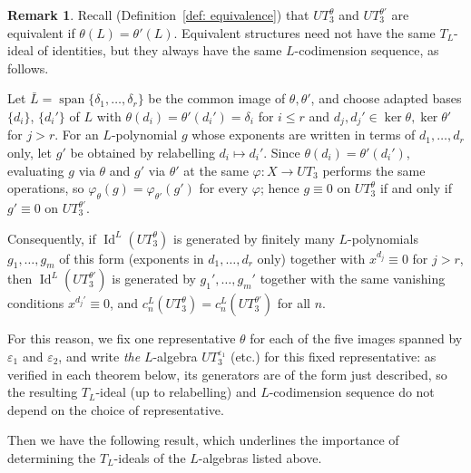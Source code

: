 \documentclass[a4paper,reqno]{amsart}
\theoremstyle{definition}
\newtheorem{remark}[theorem]{Remark}
\numberwithin{equation}{section}
\numberwithin{theorem}{section}
\DeclareMathOperator{\I}{Id}
\DeclareMathOperator{\spn}{span}
\begin{document}
\begin{remark}\label{rmk: equivalence}Recall (Definition~\ref{def: equivalence}) that $UT_3^\theta$ and $UT_3^{\theta'}$ are equivalent
if $\theta(L)=\theta'(L)$.
Equivalent structures need not have the same $T_L$-ideal of identities, but they always have the
same $L$-codimension sequence, as follows.

Let $\bar L=\spn\{\delta_1,\ldots,\delta_r\}$ be the common image of $\theta,\theta'$, and choose
adapted bases $\{d_i\}$, $\{d_i'\}$ of $L$ with $\theta(d_i)=\theta'(d_i')=\delta_i$ for $i\le r$
and $d_j,d_j'\in\ker\theta,\ker\theta'$ for $j>r$. For an $L$-polynomial $g$ whose exponents are
written in terms of $d_1,\ldots,d_r$ only, let $g'$ be obtained by relabelling $d_i\mapsto d_i'$.
Since $\theta(d_i)=\theta'(d_i')$, evaluating $g$ via $\theta$ and $g'$ via $\theta'$ at the same
$\varphi:X\to UT_3$ performs the same operations, so $\varphi_\theta(g)=\varphi_{\theta'}(g')$ for
every $\varphi$; hence $g\equiv0$ on $UT_3^\theta$ if and only if $g'\equiv0$ on $UT_3^{\theta'}$.

Consequently, if $\I^L(UT_3^\theta)$ is generated by finitely many $L$-polynomials $g_1,\ldots,g_m$
of this form (exponents in $d_1,\ldots,d_r$ only) together with $x^{d_j}\equiv0$ for $j>r$, then
$\I^L(UT_3^{\theta'})$ is generated by $g_1',\ldots,g_m'$ together with the same vanishing
conditions $x^{d_j'}\equiv0$, and $c_n^L(UT_3^\theta)=c_n^L(UT_3^{\theta'})$ for all $n$.

For this reason, we fix one representative $\theta$ for each of the five images spanned by
$\varepsilon_1$ and $\varepsilon_2$, and write \emph{the} $L$-algebra $UT_3^{\varepsilon_1}$ (etc.) for
this fixed representative: as verified in each theorem below, its generators are of the form just
described, so the resulting $T_L$-ideal (up to relabelling) and $L$-codimension sequence do not
depend on the choice of representative.
\end{remark}



Then we have the following result,  which underlines the importance of determining the $T_L$-ideals of the $L$-algebras listed above.
\end{document}
